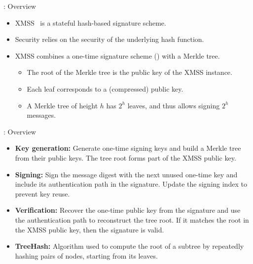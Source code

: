 \begin{frame}{\xmss: Overview}
  \begin{itemize}
      \setlength{\itemsep}{4mm}
    \item XMSS~\cite{DBLP:conf/pqcrypto/BuchmannDH11} is a stateful
      hash-based signature scheme.
    \item Security relies on the security of the underlying hash function.
    \item XMSS combines a one-time signature scheme (\wots) with a Merkle tree.
      \vspace{2mm}
      \begin{itemize}
          \setlength{\itemsep}{1mm}
        \item The root of the Merkle tree is the public key of the
          XMSS instance.
        \item Each leaf corresponds to a (compressed) \wots public key.
        \item A Merkle tree of height $h$ has $2^h$ leaves, and thus
          allows signing $2^h$ messages.
      \end{itemize}
  \end{itemize}
\end{frame}

\begin{frame}{\xmss: Overview}
  \begin{itemize}
    \setlength{\itemsep}{4mm}
    \item \textbf{Key generation:} Generate one-time signing keys and build
      a Merkle tree from their public keys. The tree root forms part of
      the XMSS public key.
    \item \textbf{Signing:} Sign the message digest with the next unused
      one-time key and include its authentication path in the signature.
      Update the signing index to prevent key reuse.
    \item \textbf{Verification:} Recover the one-time public key from the
      signature and use the authentication path to reconstruct the tree
      root. If it matches the root in the XMSS public key, then the signature is valid.
    \item \textbf{TreeHash:} Algorithm used to compute the root of a
      subtree by repeatedly hashing pairs of nodes, starting from its leaves.
  \end{itemize}
\end{frame}
